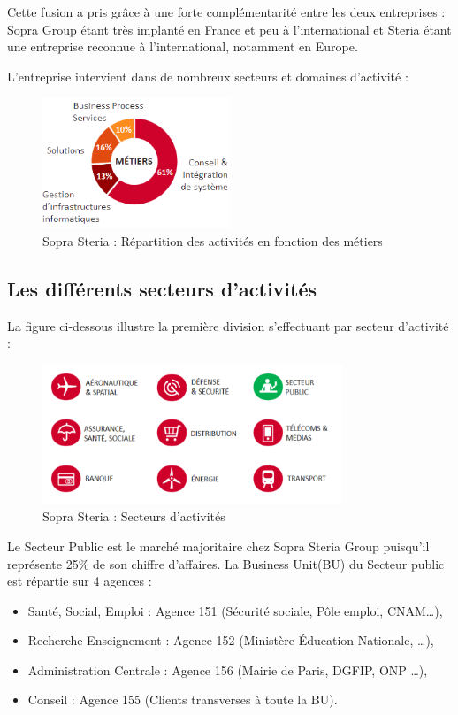 Cette fusion a pris grâce à une forte complémentarité entre les deux entreprises : Sopra Group étant très implanté en France et peu à l'international et Steria étant une entreprise reconnue à l'international, notamment en Europe.

L’entreprise intervient dans de nombreux secteurs et domaines d’activité :

\begin{figure}[!h]
\centering
\includegraphics[width=0.5\textwidth]{images/metier_soprasteria.png}
\caption{Sopra Steria : Répartition des activités en fonction des métiers}
\end{figure}

\subsection{Les différents secteurs d'activités}

La figure ci-dessous illustre la première division s’effectuant par secteur d’activité :

\begin{figure}[!h]
\centering
\includegraphics[width=0.8\textwidth]{images/secteurActivite.png}
\caption{Sopra Steria : Secteurs d'activités}
\end{figure}

Le Secteur Public est le marché majoritaire chez Sopra Steria Group puisqu’il représente 25\% de son chiffre d’affaires. La Business Unit(BU) du Secteur public est répartie sur 4 agences :  

\begin{itemize}
    \item Santé, Social, Emploi : Agence 151 (Sécurité sociale, Pôle emploi, CNAM…), 
    \item Recherche Enseignement : Agence 152 (Ministère Éducation Nationale, …), 
    \item Administration Centrale : Agence 156 (Mairie de Paris, DGFIP, ONP …), 
    \item Conseil : Agence 155 (Clients transverses à toute la BU). 
\end{itemize}

